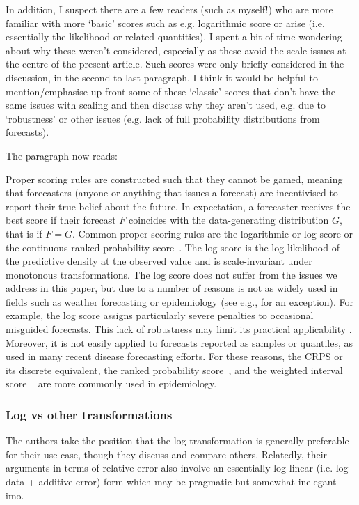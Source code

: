 \documentclass{article}
\newcommand{\red}{\color{red}}
\newcommand{\black}{\color{black}}
\begin{document}
In addition, I suspect there are a few readers (such as myself!) who are more familiar with more ‘basic’ scores such as e.g. logarithmic score or arise (i.e. essentially the likelihood or related quantities). I spent a bit of time wondering about why these weren’t considered, especially as these avoid the scale issues at the centre of the present article. Such scores were only briefly considered in the discussion, in the second-to-last paragraph. I think it would be helpful to mention/emphasise up front some of these ‘classic’ scores that don’t have the same issues with scaling and then discuss why they aren’t used, e.g. due to ‘robustness’ or other issues (e.g. lack of full probability distributions from forecasts).

\black
The paragraph now reads: 

Proper scoring rules are constructed such that they cannot be gamed, meaning that forecasters (anyone or anything that issues a forecast) are incentivised to report their true belief about the future. In expectation, a forecaster receives the best score if their forecast $F$ coincides with the data-generating distribution $G$, that is if $F = G$. Common proper scoring rules are the logarithmic or log score \citep{goodRationalDecisions1952} or the continuous ranked probability score~\citep[CRPS,][]{gneitingStrictlyProperScoring2007}. The log score is the log-likelihood of the predictive density at the observed value and is scale-invariant under monotonous transformations. The log score does not suffer from the issues we address in this paper, but due to a number of reasons is not as widely used in fields such as weather forecasting or epidemiology (see e.g., \citealt{Johansson2019} for an exception). For example, the log score assigns particularly severe penalties to occasional misguided forecasts. This lack of robustness may limit its practical applicability \cite{bracherEvaluatingEpidemicForecasts2021}. Moreover, it is not easily applied to forecasts reported as samples or quantiles, as used in many recent disease forecasting efforts. 
For these reasons, the CRPS or its discrete equivalent, the ranked probability score~\citep[RPS,][]{funkAssessingPerformanceRealtime2019}, and the weighted interval score ~\citep[WIS,][]{bracherEvaluatingEpidemicForecasts2021} are more commonly used in epidemiology. 

\red
\subsubsection{Log vs other transformations}
The authors take the position that the log transformation is generally preferable for their use case, though they discuss and compare others. Relatedly, their arguments in terms of relative error also involve an essentially log-linear (i.e. log data + additive error) form which may be pragmatic but somewhat inelegant imo.
\end{document}
